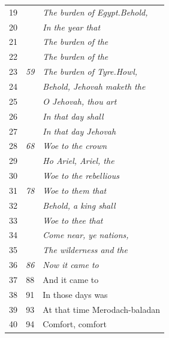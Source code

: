 \documentclass{article}
\newlength{\minipageheight}
\begin{document}
\begin{minipage}[r][\minipageheight][t]{3in}
\begin{longtable}{ccl}
        19          &              & \textit{The burden of Egypt.Behold,}    \\
        20          &              & \textit{In the year that}               \\
        21          &              & \textit{The burden of the}              \\
        22          &              & \textit{The burden of the}              \\
        23          & \textit{59}  & \textit{The burden of Tyre.Howl,}       \\
        24          &              & \textit{Behold, Jehovah maketh the}     \\
        25          &              & \textit{O Jehovah, thou art}            \\
        26          &              & \textit{In that day shall}              \\
        27          &              & \textit{In that day Jehovah}            \\
        28          & \textit{68}  & \textit{Woe to the crown}               \\
        29          &              & \textit{Ho Ariel, Ariel, the}           \\
        30          &              & \textit{Woe to the rebellious}          \\
        31          & \textit{78}  & \textit{Woe to them that}               \\
        32          &              & \textit{Behold, a king shall}           \\
        33          &              & \textit{Woe to thee that}               \\
        34          &              & \textit{Come near, ye nations,}         \\
        35          &              & \textit{The wilderness and the}         \\
        36          & \textit{86}  & \textit{Now it came to}                 \\
        37          & 88           & And it came to                          \\
        38          & 91           & In those days was                       \\
        39          & 93           & At that time Merodach-baladan           \\
        40          & 94           & Comfort, comfort                        \\

\end{longtable}
\end{minipage}
\end{document}
